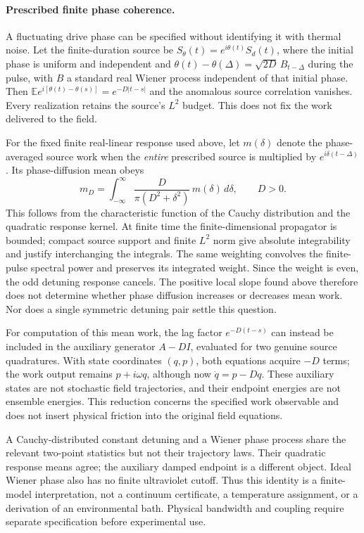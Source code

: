 \paragraph{Prescribed finite phase coherence.}
A fluctuating drive phase can be specified without identifying it with
thermal noise. Let the finite-duration source be
$S_\theta(t)=e^{i\theta(t)}S_d(t)$, where the initial phase is uniform and
independent and $\theta(t)-\theta(\Delta)=\sqrt{2D}\,B_{t-\Delta}$ during
the pulse, with $B$ a standard real Wiener process independent of that initial phase. Then
$\mathbb E e^{i[\theta(t)-\theta(s)]}=e^{-D|t-s|}$ and the anomalous
source correlation vanishes. Every realization retains the source's
$L^2$ budget. This does not fix the work delivered to the field.

For the fixed finite real-linear response used above, let $m(\delta)$ denote
the phase-averaged source work when the \emph{entire} prescribed source
is multiplied by $e^{i\delta(t-\Delta)}$. Its phase-diffusion mean obeys
\[
 m_D=\int_{-\infty}^{\infty}
 \frac{D}{\pi(D^2+\delta^2)}\,m(\delta)\,d\delta,
 \qquad D>0.
\]
This follows from the characteristic function of the Cauchy distribution
and the quadratic response kernel. At finite time the finite-dimensional
propagator is bounded; compact source support and finite $L^2$ norm give
absolute integrability and justify interchanging the integrals.
The same weighting convolves the finite-pulse spectral power and preserves
its integrated weight. Since the weight is even, the odd detuning response
cancels. The positive local slope found above therefore does not determine
whether phase diffusion increases or decreases mean work. Nor does a single
symmetric detuning pair settle this question.

For computation of this mean work, the lag factor $e^{-D(t-s)}$ can instead
be included in the auxiliary generator $A-DI$, evaluated for two genuine
source quadratures. With state coordinates $(q,p)$, both equations acquire
$-D$ terms; the work output remains $p+i\omega q$, although now
$\dot q=p-Dq$. These auxiliary states are not stochastic field trajectories,
and their endpoint energies are not ensemble energies. This reduction
concerns the specified work observable and does not insert physical friction
into the original field equations.

A Cauchy-distributed constant detuning and a Wiener phase process share the
relevant two-point statistics but not their trajectory laws. Their quadratic
response means agree; the auxiliary damped endpoint is a different object.
Ideal Wiener phase also has no finite ultraviolet cutoff. Thus this identity
is a finite-model interpretation, not a continuum certificate, a temperature
assignment, or a derivation of an environmental bath. Physical bandwidth and
coupling require separate specification before experimental use.
